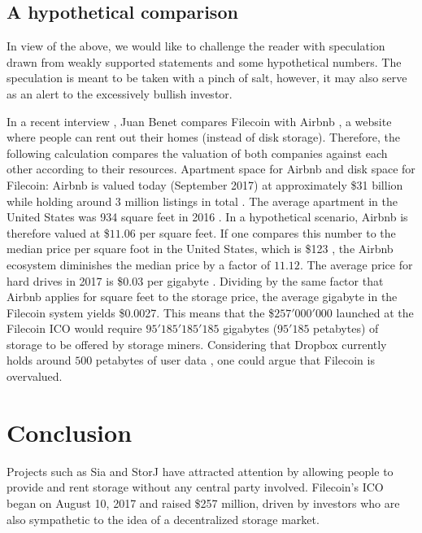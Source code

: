 \documentclass[conference]{IEEEtran}
\begin{document}
\subsection{A hypothetical comparison}

In view of the above, we would like to challenge the reader with speculation drawn from weakly supported statements and some hypothetical numbers.
The speculation is meant to be taken with a pinch of salt, however, it may also serve as an alert to the excessively bullish investor.

In a recent interview \cite{podcast}, Juan Benet compares Filecoin with Airbnb \cite{airbnb}, a website where people can rent out their homes (instead of disk storage).
Therefore, the following calculation compares the valuation of both companies against each other according to their resources.
Apartment space for Airbnb and disk space for Filecoin:
Airbnb is valued today (September 2017) at approximately \$31 billion while holding around 3 million listings in total \cite{airbnb-valuation}.
The average apartment in the United States was 934 square feet in 2016 \cite{housing-cnbc}.
In a hypothetical scenario, Airbnb is therefore valued at \$$11.06$ per square feet. 
If one compares this number to the median price per square foot in the United States, which is \$123 \cite{home-prices}, the Airbnb ecosystem diminishes the median price by a factor of $11.12$.
The average price for hard drives in 2017 is \$0.03 per gigabyte \cite{hard-drive}.
Dividing by the same factor that Airbnb applies for square feet to the storage price, the average gigabyte in the Filecoin system yields \$0.0027.
This means that the \$$257'000'000$ launched at the Filecoin ICO would require $95'185'185'185$ gigabytes ($95'185$ petabytes) of storage to be offered by storage miners.
Considering that Dropbox \cite{dropbox} currently holds around $500$ petabytes of user data \cite{dropbox-userdata}, one could argue that Filecoin is overvalued.

\section{Conclusion}
\label{sec:conclusion}

Projects such as Sia and StorJ have attracted attention by allowing people to provide and rent storage without any central party involved.
Filecoin's ICO began on August 10, 2017 and raised \$257 million, driven by investors who are also sympathetic to the idea of a decentralized storage market.
\end{document}
